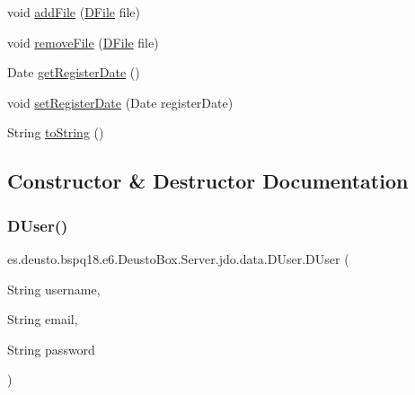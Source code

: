 \begin{DoxyCompactItemize}
\item 
void \mbox{\hyperlink{classes_1_1deusto_1_1bspq18_1_1e6_1_1_deusto_box_1_1_server_1_1jdo_1_1data_1_1_d_user_ac8f06a3c18a0f8f33fb92cce814e5c52}{add\+File}} (\mbox{\hyperlink{classes_1_1deusto_1_1bspq18_1_1e6_1_1_deusto_box_1_1_server_1_1jdo_1_1data_1_1_d_file}{D\+File}} file)
\item 
void \mbox{\hyperlink{classes_1_1deusto_1_1bspq18_1_1e6_1_1_deusto_box_1_1_server_1_1jdo_1_1data_1_1_d_user_a766e554bc79acf4cf88ed3317938a43c}{remove\+File}} (\mbox{\hyperlink{classes_1_1deusto_1_1bspq18_1_1e6_1_1_deusto_box_1_1_server_1_1jdo_1_1data_1_1_d_file}{D\+File}} file)
\item 
Date \mbox{\hyperlink{classes_1_1deusto_1_1bspq18_1_1e6_1_1_deusto_box_1_1_server_1_1jdo_1_1data_1_1_d_user_a607cf19b00e15ff7f085cf5269ff8b51}{get\+Register\+Date}} ()
\item 
void \mbox{\hyperlink{classes_1_1deusto_1_1bspq18_1_1e6_1_1_deusto_box_1_1_server_1_1jdo_1_1data_1_1_d_user_a98cb3795060c889d4c4cba11ffc362b9}{set\+Register\+Date}} (Date register\+Date)
\item 
String \mbox{\hyperlink{classes_1_1deusto_1_1bspq18_1_1e6_1_1_deusto_box_1_1_server_1_1jdo_1_1data_1_1_d_user_a37772e894cde08220209c116213458e2}{to\+String}} ()
\end{DoxyCompactItemize}


\subsection{Constructor \& Destructor Documentation}
\mbox{\label{classes_1_1deusto_1_1bspq18_1_1e6_1_1_deusto_box_1_1_server_1_1jdo_1_1data_1_1_d_user_a2c32d9559b50edfe6b9f82a9d71a8e44}} 
\subsubsection{\texorpdfstring{D\+User()}{DUser()}\hspace{0.1cm}{\footnotesize\ttfamily [1/2]}}
{\footnotesize\ttfamily es.\+deusto.\+bspq18.\+e6.\+Deusto\+Box.\+Server.\+jdo.\+data.\+D\+User.\+D\+User (\begin{DoxyParamCaption}\item[{String}]{username,  }\item[{String}]{email,  }\item[{String}]{password }\end{DoxyParamCaption})}

